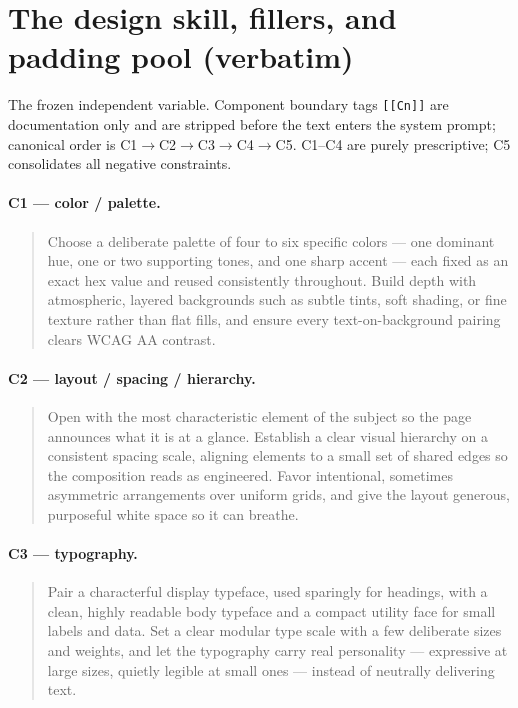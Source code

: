 
\section{The design skill, fillers, and padding pool (verbatim)}
\label{app:skill}

The frozen independent variable. Component boundary tags \texttt{[[Cn]]} are documentation only and
are stripped before the text enters the system prompt; canonical order is C1$\to$C2$\to$C3$\to$C4$\to$C5.
C1--C4 are purely prescriptive; C5 consolidates all negative constraints.

\paragraph{C1 --- color / palette.}
\begin{quote}\small
Choose a deliberate palette of four to six specific colors --- one dominant hue, one or two supporting
tones, and one sharp accent --- each fixed as an exact hex value and reused consistently throughout.
Build depth with atmospheric, layered backgrounds such as subtle tints, soft shading, or fine texture
rather than flat fills, and ensure every text-on-background pairing clears WCAG AA contrast.
\end{quote}
\paragraph{C2 --- layout / spacing / hierarchy.}
\begin{quote}\small
Open with the most characteristic element of the subject so the page announces what it is at a glance.
Establish a clear visual hierarchy on a consistent spacing scale, aligning elements to a small set of
shared edges so the composition reads as engineered. Favor intentional, sometimes asymmetric
arrangements over uniform grids, and give the layout generous, purposeful white space so it can breathe.
\end{quote}
\paragraph{C3 --- typography.}
\begin{quote}\small
Pair a characterful display typeface, used sparingly for headings, with a clean, highly readable body
typeface and a compact utility face for small labels and data. Set a clear modular type scale with a few
deliberate sizes and weights, and let the typography carry real personality --- expressive at large
sizes, quietly legible at small ones --- instead of neutrally delivering text.
\end{quote}
